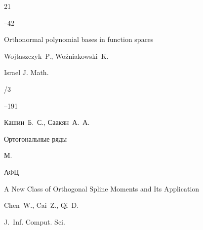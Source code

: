 \begin{thebibliography}{21}



--42















\paper Orthonormal polynomial bases in function spaces 

\by Wojtaszczyk~P., Wo\'zniakowski~K. 

\jour Israel J. Math. 



/3

--191





\by Кашин~Б.~С., Саакян~А.~А. 

\book Ортогональные ряды

\publaddr М. 

\publ АФЦ 







\paper A New Class of Orthogonal Spline Moments and Its Application

\by Chen~W., Cai~Z., Qi~D. 

\jour J.~Inf. Comput. Sci.



\end{thebibliography}
